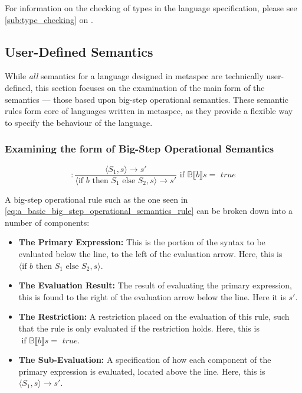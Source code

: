 For information on the checking of types in the language specification, please see \autoref{sub:type_checking} on . 


\subsection{User-Defined Semantics} %
\label{sub:user_defined_semantics}
While \textit{all} semantics for a language designed in \gls{metaspec} are technically user-defined, this section focuses on the examination of the main form of the semantics --- those based upon big-step operational semantics. 
These semantic rules form core of languages written in \gls{metaspec}, as they provide a flexible way to specify the behaviour of the language. 

\subsubsection{Examining the form of Big-Step Operational Semantics} %
\label{ssub:examining_the_form_of_big_step_operational_semantics}
\begin{equation}
    [\text{if}] : \frac{\langle S_1, s \rangle \to s'}{\langle \text{if } b \text{ then } S_1 \text{ else } S_2, s\rangle \to s'} \text{ if } \mathbb{B}\llbracket b \rrbracket s = \textit{ true} 
    \label{eq:a_basic_big_step_operational_semantics_rule}
\end{equation}

A big-step operational rule such as the one seen in \autoref{eq:a_basic_big_step_operational_semantics_rule} can be broken down into a number of components:
\begin{itemize}
    \item \textbf{The Primary Expression:} \label{item:the_primary_expression} This is the portion of the syntax to be evaluated below the line, to the left of the evaluation arrow.
    Here, this is $\langle \text{if } b \text{ then } S_1 \text{ else } S_2, s \rangle$.
    \item \textbf{The Evaluation Result:} The result of evaluating the primary expression, this is found to the right of the evaluation arrow below the line.
    Here it is $s'$. 
    \item \textbf{The Restriction:} A restriction placed on the evaluation of this rule, such that the rule is only evaluated if the restriction holds. 
    Here, this is $\text{ if } \mathbb{B}\llbracket b \rrbracket s = \textit{ true}$.
    \item \textbf{The Sub-Evaluation:} A specification of how each component of the primary expression is evaluated, located above the line.
    Here, this is $\langle S_1, s \rangle \to s'$. 
\end{itemize}

